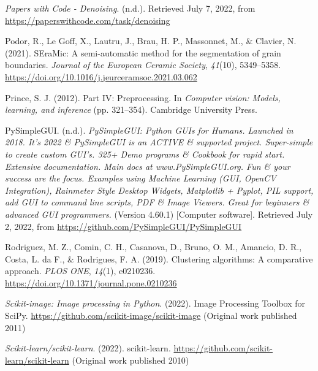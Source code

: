 \documentclass[
  12pt,
  openany]{book}
\newlength{\cslhangindent}
\newlength{\cslentryspacingunit} %
\newenvironment{CSLReferences}[2] %
 {%
  \setlength{\parindent}{0pt}
  \ifodd #1
  \let\oldpar\par
  \def\par{\hangindent=\cslhangindent\oldpar}
  \fi
  \setlength{\parskip}{#2\cslentryspacingunit}
 }%
 {}
\begin{document}
\begin{CSLReferences}{1}{0}
\leavevmode{}%
\emph{Papers with {Code} - {Denoising}}. (n.d.). Retrieved July 7, 2022, from \url{https://paperswithcode.com/task/denoising}

\leavevmode{}%
Podor, R., Le Goff, X., Lautru, J., Brau, H. P., Massonnet, M., \& Clavier, N. (2021). {SEraMic}: {A} semi-automatic method for the segmentation of grain boundaries. \emph{Journal of the European Ceramic Society}, \emph{41}(10), 5349--5358. \url{https://doi.org/10.1016/j.jeurceramsoc.2021.03.062}

\leavevmode{}%
Prince, S. J. (2012). Part {IV}: {Preprocessing}. In \emph{Computer vision: Models, learning, and inference} (pp. 321--354). {Cambridge University Press}.

\leavevmode{}%
PySimpleGUI. (n.d.). \emph{{PySimpleGUI}: {Python GUIs} for {Humans}. {Launched} in 2018. {It}'s 2022 \& {PySimpleGUI} is an {ACTIVE} \& supported project. {Super-simple} to create custom {GUI}'s. 325+ {Demo} programs \& {Cookbook} for rapid start. {Extensive} documentation. {Main} docs at www.{PySimpleGUI}.org. {Fun} \& your success are the focus. {Examples} using {Machine Learning} ({GUI}, {OpenCV Integration}), {Rainmeter Style Desktop Widgets}, {Matplotlib} + {Pyplot}, {PIL} support, add {GUI} to command line scripts, {PDF} \& {Image Viewers}. {Great} for beginners \& advanced {GUI} programmers.} (Version 4.60.1) {[}Computer software{]}. Retrieved July 2, 2022, from \url{https://github.com/PySimpleGUI/PySimpleGUI}

\leavevmode{}%
Rodriguez, M. Z., Comin, C. H., Casanova, D., Bruno, O. M., Amancio, D. R., Costa, L. da F., \& Rodrigues, F. A. (2019). Clustering algorithms: {A} comparative approach. \emph{PLOS ONE}, \emph{14}(1), e0210236. \url{https://doi.org/10.1371/journal.pone.0210236}

\leavevmode{}%
\emph{Scikit-image: {Image} processing in {Python}}. (2022). {Image Processing Toolbox for SciPy}. \url{https://github.com/scikit-image/scikit-image} (Original work published 2011)

\leavevmode{}%
\emph{Scikit-learn/scikit-learn}. (2022). {scikit-learn}. \url{https://github.com/scikit-learn/scikit-learn} (Original work published 2010)


\end{CSLReferences}
\end{document}
